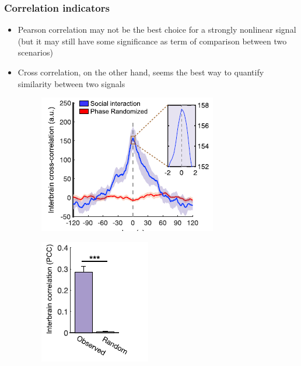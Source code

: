 \documentclass{beamer}
\begin{document}
\begin{frame}
\frametitle{Correlation indicators}


\begin{itemize}
	\item Pearson correlation may not be the best choice for a strongly nonlinear signal (but it may still have some significance as term of comparison between two scenarios)
	
	\item Cross correlation, on the other hand, seems the best way to quantify similarity between two signals
	
\vspace{1 cm}
		\begin{minipage}{\linewidth}
		\centering
		\begin{minipage}{0.20\linewidth}
			\begin{figure}[H]
				\includegraphics[scale=.70]{kingsbury1.png}
				
			\end{figure}
		\end{minipage}
		\hspace{0.7 cm}
		\begin{minipage}{0.70\linewidth}
			\begin{figure}[H]
				\includegraphics[scale=.70]{kingsbury2.png}
				
			\end{figure}
		\end{minipage}
	\end{minipage}
		
	
	
\end{itemize}





\end{frame}	
\end{document}
